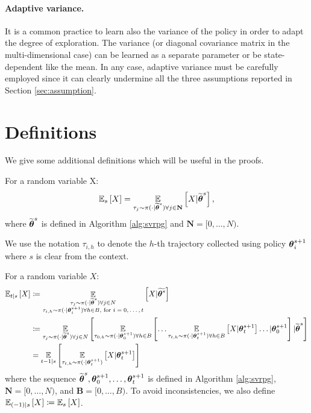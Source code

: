 \paragraph{Adaptive variance.}
It is a common practice to learn also the variance of the policy in order to adapt the degree of exploration. The variance (or diagonal covariance matrix in the multi-dimensional case) can be learned as a separate parameter or be state-dependent like the mean. In any case, adaptive variance must be carefully employed since it can clearly undermine all the three assumptions reported in Section  \ref{sec:assumption}.

\section{Definitions}\label{sec:definition}

We give some additional definitions which will be useful in the proofs.

\begin{definition}
	For a random variable X:
	\[
	\Es{X} = \EVV[\tau_j\sim\pi(\cdot\vert\wt{\vtheta}^s)
	\forall j\in\mathbf{N}]{X\vert\wt{\vtheta}^s},
	\]
	where $\wt{\vtheta}^s$ is defined in Algorithm \ref{alg:svrpg} and $\mathbf{N} = [0,\dots,N)$.
\end{definition}

We use the notation $\tau_{i,h}$ to denote the $h$-th trajectory collected using policy $\vtheta^{s+1}_i$ where $s$ is clear from the context.

\begin{definition}
	For a random variable $X$:
	\begin{align*}
	\mathbb{E}_{t\vert s}\left[X\right] &\coloneqq 
	\mathop{\mathbb{E}}_{\substack{\tau_j\sim\pi(\cdot\vert\wt{\vtheta}^s)\forall j \in N \\ \tau_{i,h}\sim\pi(\cdot\vert\vtheta^{s+1}_i) \forall h \in B, \text{ for $i=0,\dots,t$}}}{\left[X \vert \wt{\vtheta^s}\right]} \\
	&\coloneqq \EVV[\tau_j\sim\pi(\cdot\vert\wt{\vtheta}^s)\forall j \in N]{
		\EVV[\tau_{0,h}\sim\pi(\cdot\vert\vtheta_0^{s+1}) \forall h \in B]
		{\dots
			\EVV[\tau_{t,h}\sim\pi(\cdot\vert\vtheta_t^{s+1})\forall h \in B]
			{X\vert\vtheta_t^{s+1}}
			\dots
			\vert\vtheta_0^{s+1}}
		\vert\wt{\vtheta}^s}\\
	&= \EVV[t-1|s]{\EVV[\tau_{t,h}\sim \pi(\cdot|\vtheta^{s+1}_t)]{X|\vtheta^{s+1}_t}}
	\end{align*}
	where the sequence $\wt{\vtheta}^s,\vtheta_0^{s+1},\dots,\vtheta_t^{s+1}$ is defined in Algorithm \ref{alg:svrpg}, $\mathbf{N} = [0,\dots,N)$, and $\mathbf{B} = [0,\dots,B)$. To avoid inconsistencies, we also define $\Ets[(-1)]{X} \coloneqq \Es{X}$.
	
\end{definition}

